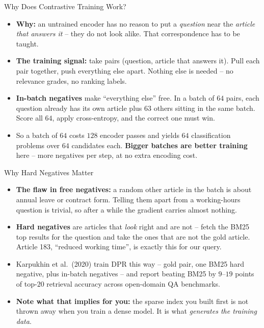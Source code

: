 \begin{frame}{Why Does Contrastive Training Work?}
\begin{itemize}
  \item \textbf{Why:} an untrained encoder has no reason to put a \emph{question} near the \emph{article that answers it} -- they do not look alike. That correspondence has to be taught.
  \pause
  \item \textbf{The training signal:} take pairs (question, article that answers it). Pull each pair together, push everything else apart. Nothing else is needed -- no relevance grades, no ranking labels.
  \pause
  \item \textbf{In-batch negatives} make ``everything else'' free. In a batch of $64$ pairs, each question already has its own article plus $63$ others sitting in the same batch. Score all $64$, apply cross-entropy, and the correct one must win.
  \pause
  \item So a batch of $64$ costs $128$ encoder passes and yields $64$ classification problems over $64$ candidates each. \textbf{Bigger batches are better training} here -- more negatives per step, at no extra encoding cost.
\end{itemize}
\end{frame}

\begin{frame}{Why Hard Negatives Matter}
\begin{itemize}
  \item \textbf{The flaw in free negatives:} a random other article in the batch is about annual leave or contract form. Telling them apart from a working-hours question is trivial, so after a while the gradient carries almost nothing.
  \pause
  \item \textbf{Hard negatives} are articles that \emph{look} right and are not -- fetch the BM25 top results for the question and take the ones that are not the gold article. Article 183, ``reduced working time'', is exactly this for our query.
  \pause
  \item Karpukhin et al.\ (2020) train DPR this way -- gold pair, one BM25 hard negative, plus in-batch negatives -- and report beating BM25 by $9$--$19$ points of top-$20$ retrieval accuracy across open-domain QA benchmarks.
  \pause
  \item \textbf{Note what that implies for you:} the sparse index you built first is not thrown away when you train a dense model. It is what \emph{generates the training data}.
\end{itemize}
\end{frame}
